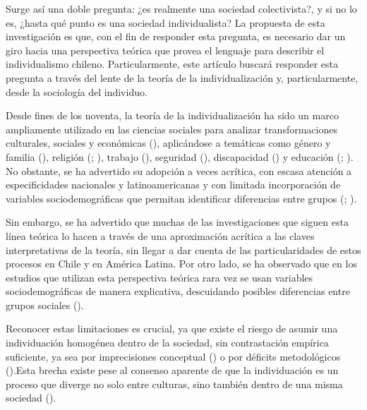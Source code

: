 \documentclass[
  12pt,
  letterpaper,
  DIV=11,
  numbers=noendperiod]{scrartcl}
\begin{document}
Surge así una doble pregunta: ¿es realmente una sociedad colectivista?,
y si no lo es, ¿hasta qué punto es una sociedad individualista? La
propuesta de esta investigación es que, con el fin de responder esta
pregunta, es necesario dar un giro hacia una perspectiva teórica que
provea el lenguaje para describir el individualismo chileno.
Particularmente, este artículo buscará responder esta pregunta a través
del lente de la teoría de la individualización y, particularmente, desde
la sociología del individuo.

Desde fines de los noventa, la teoría de la individualización ha sido un
marco ampliamente utilizado en las ciencias sociales para analizar
transformaciones culturales, sociales y económicas
(), aplicándose a temáticas como
género y familia (),
religión (;
),
trabajo (), seguridad
(),
discapacidad () y educación (; ). No
obstante, se ha advertido su adopción a veces acrítica, con escasa
atención a especificidades nacionales y latinoamericanas y con limitada
incorporación de variables sociodemográficas que permitan identificar
diferencias entre grupos (; ).

Sin embargo, se ha advertido que muchas de las investigaciones que
siguen esta línea teórica lo hacen a través de una aproximación acrítica
a las claves interpretativas de la teoría, sin llegar a dar cuenta de
las particularidades de estos procesos en Chile y en América Latina. Por
otro lado, se ha observado que en los estudios que utilizan esta
perspectiva teórica rara vez se usan variables sociodemográficas de
manera explicativa, descuidando posibles diferencias entre grupos
sociales ().

Reconocer estas limitaciones es crucial, ya que existe el riesgo de
asumir una individuación homogénea dentro de la sociedad, sin
contrastación empírica suficiente, ya sea por imprecisiones conceptual
() o por déficits metodológicos
().Esta brecha existe pese
al consenso aparente de que la individuación es un proceso que diverge
no solo entre culturas, sino también dentro de una misma sociedad
().
\end{document}
